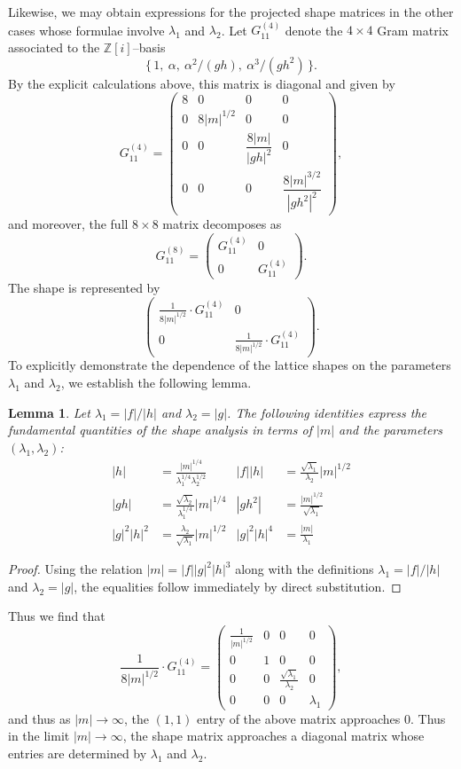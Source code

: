 \documentclass{amsart}
\newcommand{\Z}{\mathbb{Z}}
\theoremstyle{plain}
\newtheorem{lemma}[theorem]{Lemma}
\theoremstyle{definition}
\theoremstyle{remark}
\numberwithin{equation}{section}
\begin{document}
\par Likewise, we may obtain expressions for the projected shape matrices in the other cases whose formulae involve $\lambda_1$ and $\lambda_2$. Let $G_{11}^{(4)}$ denote the $4\times 4$ Gram matrix associated to the $\Z[i]$--basis
\[
\{\,1,\ \alpha,\ \alpha^{2}/(gh),\ \alpha^{3}/(gh^{2})\,\}.
\]
By the explicit calculations above, this matrix is diagonal and given by
\[
G_{11}^{(4)}
=
\begin{pmatrix}
8 & 0 & 0 & 0 \\
0 & 8|m|^{1/2} & 0 & 0 \\
0 & 0 & \dfrac{8|m|}{|gh|^{2}} & 0 \\
0 & 0 & 0 & \dfrac{8|m|^{3/2}}{|gh^2|^{2}}
\end{pmatrix},
\]
and moreover, the full $8\times 8$ matrix decomposes as
\[
G_{11}^{(8)}
=
\begin{pmatrix}
G_{11}^{(4)} & 0 \\
0 & G_{11}^{(4)}
\end{pmatrix}.
\]
The shape is represented by 
\[\begin{pmatrix}
\frac{1}{8|m|^{1/2}}\cdot  G_{11}^{(4)} & 0 \\
0 & \frac{1}{8|m|^{1/2}}\cdot G_{11}^{(4)}
\end{pmatrix}.\]
To explicitly demonstrate the dependence of the lattice shapes on the parameters $\lambda_1$ and $\lambda_2$, we establish the following lemma. 
\begin{lemma}\label{lem:iden}
Let $\lambda_1 = |f|/|h|$ and $\lambda_2 = |g|$. The following identities express the fundamental quantities of the shape analysis in terms of $|m|$ and the parameters $(\lambda_1, \lambda_2)$:
\begin{align*}
    |h| &= \frac{|m|^{1/4}}{\lambda_1^{1/4} \lambda_2^{1/2}} &
    |f||h| &= \frac{\sqrt{\lambda_1}}{\lambda_2} |m|^{1/2} \\
    |gh| &= \frac{\sqrt{\lambda_2}}{\lambda_1^{1/4}} |m|^{1/4} &
    |gh^2| &= \frac{|m|^{1/2}}{\sqrt{\lambda_1}} \\
    |g|^2|h|^2 &= \frac{\lambda_2}{\sqrt{\lambda_1}} |m|^{1/2} &
    |g|^2|h|^4 &= \frac{|m|}{\lambda_1}
\end{align*}
\end{lemma}

\begin{proof}
Using the relation $|m| = |f||g|^2|h|^3$ along with the definitions $\lambda_1 = |f|/|h|$ and $\lambda_2 = |g|$, the equalities follow immediately by direct substitution.
\end{proof}
\noindent Thus we find that 
\[
\frac{1}{8|m|^{1/2}}\cdot  G_{11}^{(4)}=\begin{pmatrix}
\frac{1}{|m|^{1/2}} & 0 & 0 & 0 \\
0 & 1 & 0 & 0 \\
0 & 0 & \frac{\sqrt{\lambda_1}}{\lambda_2} & 0 \\
0 & 0 & 0 & \lambda_1
\end{pmatrix},
\]
and thus as $|m|\rightarrow \infty$, the $(1,1)$ entry of the above matrix approaches $0$. Thus in the limit $|m|\rightarrow \infty$, the shape matrix approaches a diagonal matrix whose entries are determined by $\lambda_1$ and $\lambda_2$.
\end{document}
